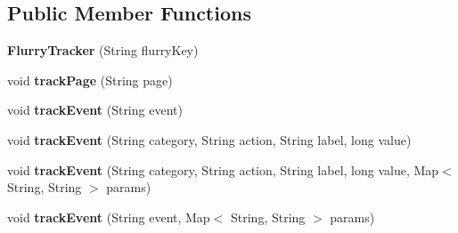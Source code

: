 \subsection*{Public Member Functions}
\begin{DoxyCompactItemize}
\item 
\hypertarget{classcom_1_1spilgames_1_1framework_1_1tracking_1_1impl_1_1_flurry_tracker_a73deabb6e176eaee4cd3532a600c7077}{{\bfseries Flurry\-Tracker} (String flurry\-Key)}\label{classcom_1_1spilgames_1_1framework_1_1tracking_1_1impl_1_1_flurry_tracker_a73deabb6e176eaee4cd3532a600c7077}

\item 
\hypertarget{classcom_1_1spilgames_1_1framework_1_1tracking_1_1impl_1_1_flurry_tracker_a0fd649be85b61f45ae73164be40a2be2}{void {\bfseries track\-Page} (String page)}\label{classcom_1_1spilgames_1_1framework_1_1tracking_1_1impl_1_1_flurry_tracker_a0fd649be85b61f45ae73164be40a2be2}

\item 
\hypertarget{classcom_1_1spilgames_1_1framework_1_1tracking_1_1impl_1_1_flurry_tracker_a00a32bc51f90012d8252eacbdf068949}{void {\bfseries track\-Event} (String event)}\label{classcom_1_1spilgames_1_1framework_1_1tracking_1_1impl_1_1_flurry_tracker_a00a32bc51f90012d8252eacbdf068949}

\item 
\hypertarget{classcom_1_1spilgames_1_1framework_1_1tracking_1_1impl_1_1_flurry_tracker_adc5ed610df0ce8a66b55e938ad3bdbf3}{void {\bfseries track\-Event} (String category, String action, String label, long value)}\label{classcom_1_1spilgames_1_1framework_1_1tracking_1_1impl_1_1_flurry_tracker_adc5ed610df0ce8a66b55e938ad3bdbf3}

\item 
\hypertarget{classcom_1_1spilgames_1_1framework_1_1tracking_1_1impl_1_1_flurry_tracker_ae1ba2e36a3840c89dcc29f8514ebe8fc}{void {\bfseries track\-Event} (String category, String action, String label, long value, Map$<$ String, String $>$ params)}\label{classcom_1_1spilgames_1_1framework_1_1tracking_1_1impl_1_1_flurry_tracker_ae1ba2e36a3840c89dcc29f8514ebe8fc}

\item 
\hypertarget{classcom_1_1spilgames_1_1framework_1_1tracking_1_1impl_1_1_flurry_tracker_a2295d802bc6a4d710818c40ffc9dd419}{void {\bfseries track\-Event} (String event, Map$<$ String, String $>$ params)}\label{classcom_1_1spilgames_1_1framework_1_1tracking_1_1impl_1_1_flurry_tracker_a2295d802bc6a4d710818c40ffc9dd419}


\end{DoxyCompactItemize}
